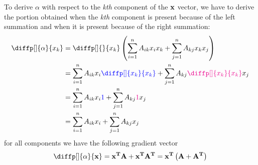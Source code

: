 \documentclass[12pt]{article}
\begin{document}
To derive $\alpha$ with respect to the \textit{kth} component of the $\boldsymbol{\mathbf{x}}$ vector, we have to derive the portion obtained when the \textit{kth} component is present because of the left summation and when it is present because of the right summation:
\begin{equation}
\begin{aligned}
    \diffp[]{\alpha}{x_k} &= \diffp[]{}{x_k} \parentheses{\Sum{1}{n} A_{ik}x_i x_k + \Sum[j]{1}{n} A_{kj}x_k x_j} \\
    &= \Sum{1}{n} A_{ik}x_i \blue{\diffp[]{x_k}{x_k}} + \Sum[j]{1}{n} A_{kj}\magenta{\diffp[]{x_k}{x_k}} x_j\\
    &= \Sum{1}{n} A_{ik}x_i \blue{1} + \Sum[j]{1}{n} A_{kj}\magenta{1} x_j\\
    &= \Sum{1}{n} A_{ik}x_i + \Sum[j]{1}{n} A_{kj} x_j\\
\end{aligned}
\label{}
\end{equation}
for all components we have the following gradient vector
\begin{equation}
    \diffp[]{\alpha}{\bvec{x}} = \bvecT{x}\mat{A} + \bvecT{x}\matT{A} = \bvecT{x} \parentheses{\mat{A} + \matT{A}}
\end{equation}
\end{document}
